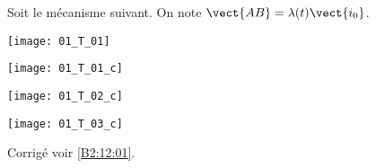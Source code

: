 \normaltrue
\correctiontrue



\setcounter{question}{0}
\ifcorrection
\else
{}
\fi

\ifprof
\else
Soit le mécanisme suivant. On note $\vect{AB}=\lambda(t)\vect{i_0}$.
\begin{center}
\texttt{[image: 01\_T\_01]}
\end{center}
\fi

\ifprof
\begin{multicols}{3}
\else
\fi
{}
\ifprof\begin{center}
\texttt{[image: 01\_T\_01\_c]}
\end{center}
\else
\fi


\ifprof
\begin{center}
\texttt{[image: 01\_T\_02\_c]}
\end{center}
\else
\fi

\ifprof
\begin{center}
\texttt{[image: 01\_T\_03\_c]}
\end{center}
\else
\fi


\ifprof
\end{multicols}
\else
\fi

\ifprof
\else
\begin{flushright}
\footnotesize{Corrigé  voir \ref{B2:12:01}.}
\end{flushright}%
\fi



